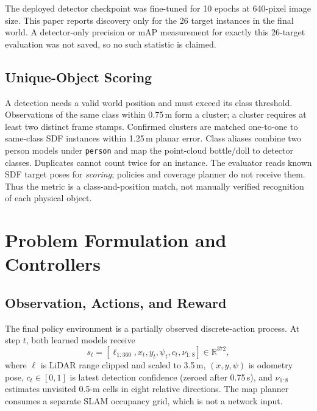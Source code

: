 \documentclass[conference]{IEEEtran}
\begin{document}
The deployed detector checkpoint was fine-tuned for 10 epochs at 640-pixel image size. This paper reports discovery only for the 26 target instances in the final world. A detector-only precision or mAP measurement for exactly this 26-target evaluation was not saved, so no such statistic is claimed.

\subsection{Unique-Object Scoring}
A detection needs a valid world position and must exceed its class threshold. Observations of the same class within 0.75\,m form a cluster; a cluster requires at least two distinct frame stamps. Confirmed clusters are matched one-to-one to same-class SDF instances within 1.25\,m planar error. Class aliases combine two person models under \texttt{person} and map the point-cloud bottle/doll to detector classes. Duplicates cannot count twice for an instance. The evaluator reads known SDF target poses for \emph{scoring}; policies and coverage planner do not receive them. Thus the metric is a class-and-position match, not manually verified recognition of each physical object.

\section{Problem Formulation and Controllers}
\subsection{Observation, Actions, and Reward}
The final policy environment is a partially observed discrete-action process. At step $t$, both learned models receive
\begin{equation}
s_t=[\ell_{1:360},x_t,y_t,\psi_t,c_t,\nu_{1:8}]
\in\mathbb{R}^{372},
\label{eq:state}
\end{equation}
where $\ell$ is LiDAR range clipped and scaled to 3.5\,m, $(x,y,\psi)$ is odometry pose, $c_t\in[0,1]$ is latest detection confidence (zeroed after 0.75\,s), and $\nu_{1:8}$ estimates unvisited 0.5-m cells in eight relative directions. The map planner consumes a separate SLAM occupancy grid, which is not a network input.
\end{document}
